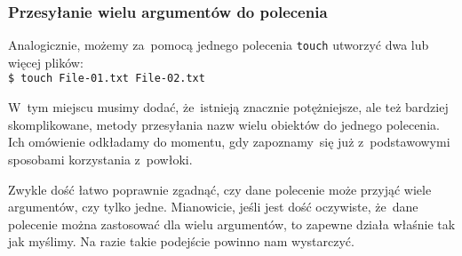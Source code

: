 \documentclass[10pt,t]{beamer}
\begin{document}
\begin{frame}
  \frametitle{Przesyłanie wielu argumentów do polecenia}




  Analogicznie, możemy za~pomocą jednego polecenia \texttt{touch} utworzyć
  dwa lub więcej plików: \\
  \texttt{\$ touch File-01.txt File-02.txt}

  W~tym miejscu musimy dodać, że~istnieją znacznie potężniejsze, ale też
  bardziej skomplikowane, metody przesyłania nazw wielu obiektów do jednego
  polecenia. Ich omówienie odkładamy do momentu, gdy zapoznamy~się już
  z~podstawowymi sposobami korzystania z~powłoki.

  Zwykle dość łatwo poprawnie zgadnąć, czy dane polecenie może przyjąć
  wiele argumentów, czy tylko jedne. Mianowicie, jeśli jest dość oczywiste,
  że~dane polecenie można zastosować dla wielu argumentów, to zapewne
  działa właśnie tak jak myślimy. Na razie takie podejście powinno nam
  wystarczyć.

\end{frame}
\end{document}
